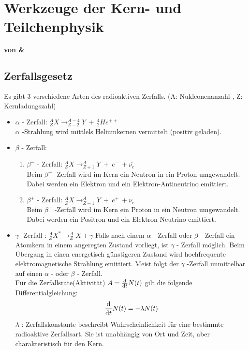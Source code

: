 \documentclass[Ex4_Zusammenfassung.tex]{subfiles}
\begin{document}
\chapter{Werkzeuge der Kern- und Teilchenphysik} 
\textbf{von \hein \& \mitsch}

\section{Zerfallsgesetz}
Es gibt 3 verschiedene Arten des radioaktiven Zerfalls.  (A: Nukleonenanzahl , Z: Kernladungszahl)
\begin{itemize}
\item  $ \alpha $  - Zerfall:  $ ^{A}_{Z}X \rightarrow ^{A-4}_{Z-2}Y \ + \ ^{4}_{2}He^{++} $    \\ $ \alpha $ -Strahlung wird mittlels Heliumkernen vermittelt (positiv geladen). 
\item $ \beta $ - Zerfall: 
	\begin{enumerate} 
	\item $ \beta^{-} $ - Zerfall: $ ^{A}_{Z} X\rightarrow ^{A}_{Z+1} Y\ + \ e^{-} \ +\overline{\nu_{e}} $  \\ Beim  $ \beta^{-} $ -Zerfall wird im Kern ein Neutron in ein Proton umgewandelt. Dabei werden ein Elektron und ein Elektron-Antineutrino emittiert.
	\item $ \beta^{+} $ - Zerfall: $ ^{A}_{Z}X \rightarrow ^{A}_{Z-1}Y \ + \ e^{+} \ +\nu_{e} $ \\ Beim $ \beta^{+} $ -Zerfall wird im Kern ein Proton in ein Neutron umgewandelt. Dabei werden ein Positron und ein Elektron-Neutrino emittiert.
	\end{enumerate}
\item $ \gamma $ -Zerfall :  $ ^{A}_{Z}X^{*} \rightarrow ^{A}_{Z}X + \gamma $ \newline Falls nach einem $ \alpha $ - Zerfall oder $ \beta $ - Zerfall ein Atomkern in einem angeregten Zustand vorliegt, ist $ \gamma $ - Zerfall möglich. Beim Übergang in einen energetisch günstigeren Zustand wird hochfrequente elektromagnetische Strahlung emittiert. Meist folgt der  $ \gamma $ -Zerfall unmittelbar auf einen $ \alpha $ - oder $ \beta $ - Zerfall. \\ 
\newline 
Für die Zerfallsrate(Aktivität) $ A = \frac{\mathrm{d} }{\mathrm{d} t} N(t)$  gilt die folgende Differentialgleichung: 
\begin{equation}
\frac{\mathrm{d} }{\mathrm{d} t} N(t) = - \lambda N(t) 
\end{equation}
$ \lambda $ : Zerfallskonstante beschreibt Wahrscheinlichkeit für eine bestimmte radioaktive Zerfallsart. Sie ist unabhängig von Ort und Zeit, aber charakteristisch für den Kern. \newline

\end{itemize}
\end{document}
